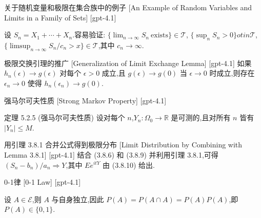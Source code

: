 \documentclass[UTF8]{ctexart}
\begin{document}
    
    
    \begin{xmp}
        {关于随机变量和极限在集合族中的例子}
        [An Example of Random Variables and Limits in a Family of Sets]
        [gpt-4.1]
        
设 $S_n = X_1 + \cdots + X_n$.容易验证:
$\{ \lim_{n \to \infty} S_n~\text{exists} \} \in \mathcal{T}$,
$\{ \sup_{n} S_n > 0 \} 
otin \mathcal{T}$,
$\{ \limsup_{n \to \infty} S_n / c_n > x \} \in \mathcal{T}$,其中 $c_n \to \infty$.

    \end{xmp}
    
    
    
    \begin{lma}
        {极限交换引理的推广}
        [Generalization of Limit Exchange Lemma]
        [gpt-4.1]
        如果 $h_{n}(\epsilon) \to g(\epsilon)$ 对每个 $\epsilon > 0$ 成立,且 $g(\epsilon) \to g(0)$ 当 $\epsilon \to 0$ 时成立,则存在 $\epsilon_{n} \to 0$ 使得 $h_{n}(\epsilon_{n}) \to g(0)$.
    \end{lma}
    
    
    
    \begin{thm}
        {强马尔可夫性质}
        [Strong Markov Property]
        [gpt-4.1]
        
定理 5.2.5 (强马尔可夫性质) 设对每个 $n$,$Y_n : \Omega_{0} \to \mathbb{R}$ 是可测的,且对所有 $n$ 皆有 $| Y_n | \leq M$.

    \end{thm}
    
    
    
    \begin{lma}
        {用引理 3.8.1 合并公式得到极限分布}
        [Limit Distribution by Combining with Lemma 3.8.1]
        [gpt-4.1]
        结合 (3.8.6) 和 (3.8.9) 并利用引理 3.8.1,可得 $(S_n - b_n) / a_n \Rightarrow Y$,其中 $E e^{i t Y}$ 由 (3.8.10) 给出.
    \end{lma}
    
    
    
    \begin{thm}
        [0-1-Law]
        {0-1律}
        [0-1 Law]
        [gpt-4.1]
        
设 $A \in \mathcal{E}$,则 $A$ 与自身独立,因此 $P(A) = P(A \cap A) = P(A) P(A)$,即 $P(A) \in \{ 0, 1 \}$.

    \end{thm}
    
\end{document}
